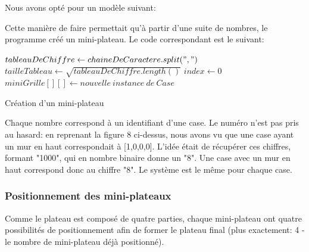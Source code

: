 \documentclass[a4paper, 12pt]{article}
\begin{document}
            Nous avons opté pour un modèle suivant:
            \vspace{0.5cm}
            
    
            
            Cette manière de faire permettait qu'à partir d'une suite de nombres, le programme créé un mini-plateau. Le code correspondant est le suivant:
                
            \begin{algorithm}[H]%
                \DontPrintSemicolon
                $tableauDeChiffre \gets chaineDeCaractere.split(",")$
                $tailleTableau \gets \sqrt{tableauDeChiffre.length()}$
                $index \gets 0$
                $miniGrille[][] \gets {nouvelle \ instance \ de \ Case }$
                \;
                \caption{\sc Création d'un mini-plateau}
            \end{algorithm}%
            
            Chaque nombre correspond à un identifiant d'une case. Le numéro n'est pas pris au hasard: en reprenant la figure 8 ci-dessus, nous avons vu que une case ayant un mur en haut correspondait à [1,0,0,0]. L'idée était de récupérer ces chiffres, formant "1000", qui en nombre binaire donne un "8". Une case avec un mur en haut correspond donc au chiffre "8". Le système est le même pour chaque case.
            
            \subsubsection{Positionnement des mini-plateaux}
    
            Comme le plateau est composé de quatre parties, chaque mini-plateau ont quatre possibilités de positionnement afin de former le plateau final (plus exactement: 4 - le nombre de mini-plateau déjà positionné).
        
            \begin{center}
            \end{center}
            
\end{document}
